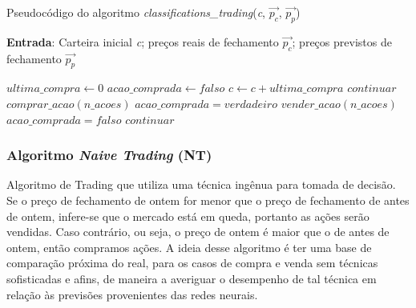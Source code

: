\begin{algorithm}[H]
\caption{Pseudocódigo do algoritmo \textit{classifications\_trading}(\textit{c}, $ \vec{p_c} $, $ \vec{p_p} $)}
\scriptsize
\textbf{Entrada}: Carteira inicial \textit{c}; preços reais de fechamento $ \vec{p_c} $; preços previstos de fechamento $ \vec{p_p} $
\begin{algorithmic}[1]
\footnotesize
{}
    \State $ultima\_compra\gets 0$
    \State $acao\_comprada\gets falso$
                \State $c \gets c + ultima\_compra$
            \Else
                        \State $continuar$
                    \Else
                        \State $comprar\_acao(n\_acoes)$
                        \State $acao\_comprada = verdadeiro$
                    \EndIf
                \Else
                        \State $vender\_acao(n\_acoes)$
                        \State $acao\_comprada = falso$
                    \Else
                        \State $continuar$
                    \EndIf
                \EndIf
            \EndIf
        \EndFor
\EndFunction
\end{algorithmic}
\end{algorithm}


\subsubsection{Algoritmo \textit{Naive Trading} (NT)}


\par
Algoritmo de Trading que utiliza uma técnica ingênua para tomada de decisão. Se o preço de fechamento de ontem for menor que o preço de fechamento de antes de ontem, infere-se que o mercado está em queda, portanto as ações serão vendidas. Caso contrário, ou seja, o preço de ontem é maior que o de antes de ontem, então compramos ações. A ideia desse algoritmo é ter uma base de comparação próxima do real, para os casos de compra e venda sem técnicas sofisticadas e afins, de maneira a averiguar o desempenho de tal técnica em relação às previsões provenientes das redes neurais.


